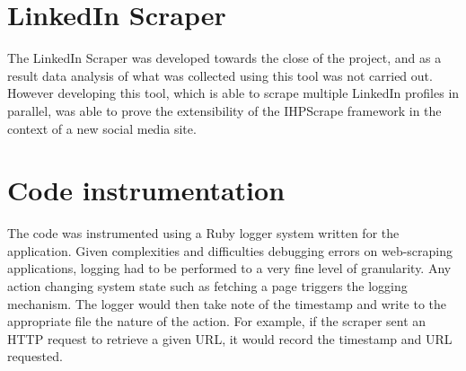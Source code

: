 




\section{LinkedIn Scraper}

The LinkedIn Scraper was developed towards the close of the project, and as a result data analysis of what was collected using this tool was not carried out. However developing this tool, which is able to scrape multiple LinkedIn profiles in parallel, was able to prove the extensibility of the IHPScrape framework in the context of a new social media site. 



\section{Code instrumentation}

The code was instrumented using a Ruby logger system written for the application. Given complexities and difficulties debugging errors on web-scraping applications, logging had to be performed to a very fine level of granularity. Any action changing system state such as fetching a page triggers the logging mechanism. The logger would then take note of the timestamp and write to the appropriate file the nature of the action. For example, if the scraper sent an HTTP request to retrieve a given URL, it would record the timestamp and URL requested. 


